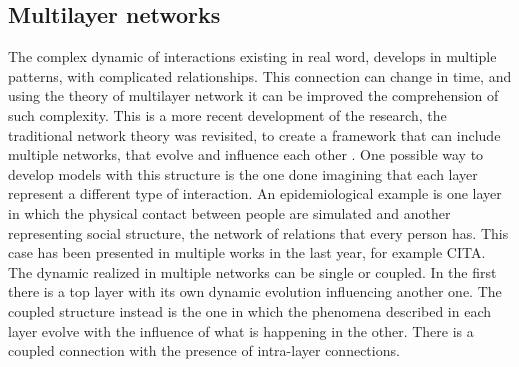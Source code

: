 \subsection{Multilayer networks}

The complex dynamic of interactions existing in real word, develops in multiple patterns, with complicated relationships. This connection can change in time, and using the theory of multilayer network it can be improved the comprehension of such complexity. This is a more recent development of the research, the traditional network theory was revisited, to create a framework that can include multiple networks, that evolve and influence each other \cite{DeDomenico2016}. 
One possible way to develop models with this structure is the one done imagining that each layer represent a different type of interaction. An epidemiological example is one layer in which the physical contact between people are simulated and another representing social structure, the network of relations that every person has. This case has been presented in multiple works in the last year, for example CITA. 
The dynamic realized in multiple networks can be single or coupled. In the first there is a top layer with its own dynamic evolution influencing another one. The coupled structure instead is the one in which the phenomena described in each layer evolve with the influence of what is happening in the other. There is a coupled connection with the presence of intra-layer connections.




